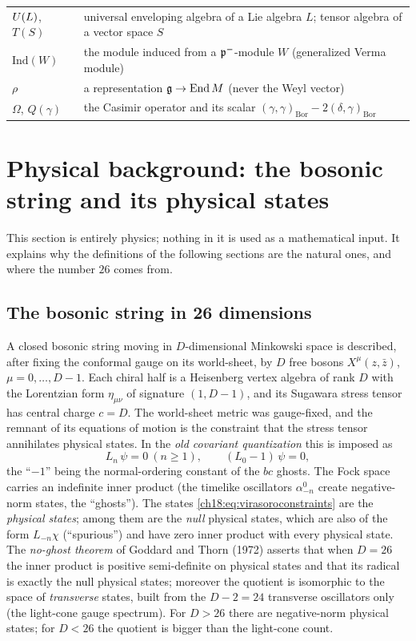 \begin{longtable}{p{}p{}}
$\mathcal \mathcal U(L)$, $T(S)$ & universal enveloping algebra of a Lie algebra $L$; tensor algebra of a vector space $S$\\
$\mathrm{Ind}(W)$ & the module induced from a $\mathfrak{p}^-$-module $W$ (generalized Verma module)\\
$\rho$ & a representation $\mathfrak{g}\to\operatorname{End} M$ (never the Weyl vector)\\
$\Omega$, $Q(\gamma)$ & the Casimir operator and its scalar $(\gamma,\gamma)_{\mathrm{Bor}}-2(\delta,\gamma)_{\mathrm{Bor}}$\\
\bottomrule
\end{longtable}

\section{Physical background: the bosonic string and its physical states}\label{ch18:sec:physics}

This section is entirely physics; nothing in it is used as a mathematical input.  It explains why the
definitions of the following sections are the natural ones, and where the number $26$ comes from.

\subsection{The bosonic string in 26 dimensions}

A closed bosonic string moving in $D$-dimensional Minkowski space is described, after fixing the
conformal gauge on its world-sheet, by $D$ free bosons $X^\mu(z,\bar z)$, $\mu=0,\dots,D-1$.  Each
chiral half is a Heisenberg vertex algebra of rank $D$ with the Lorentzian form $\eta_{\mu\nu}$ of
signature $(1,D-1)$, and its Sugawara stress tensor has central charge $c=D$.  The world-sheet metric
was gauge-fixed, and the remnant of its equations of motion is the constraint that the stress tensor
annihilates physical states.  In the \emph{old covariant quantization} this is imposed as
\begin{equation}\label{ch18:eq:virasoroconstraints}
  L_n\,\psi = 0\ (n\ge1),\qquad (L_0-1)\,\psi=0,
\end{equation}
the ``$-1$'' being the normal-ordering constant of the $bc$ ghosts.  The Fock space carries an
indefinite inner product (the timelike oscillators $\alpha^0_{-n}$ create negative-norm states, the
``ghosts'').  The states \eqref{ch18:eq:virasoroconstraints} are the \emph{physical states}; among them
are the \emph{null} physical states, which are also of the form $L_{-n}\chi$ (``spurious'') and have
zero inner product with every physical state.  The \emph{no-ghost theorem} of Goddard and Thorn (1972)
asserts that when $D=26$ the inner product is positive semi-definite on physical states and that its
radical is exactly the null physical states; moreover the quotient is isomorphic to the space of
\emph{transverse} states, built from the $D-2=24$ transverse oscillators only (the light-cone gauge
spectrum).  For $D>26$ there are negative-norm physical states; for $D<26$ the quotient is bigger than
the light-cone count.

